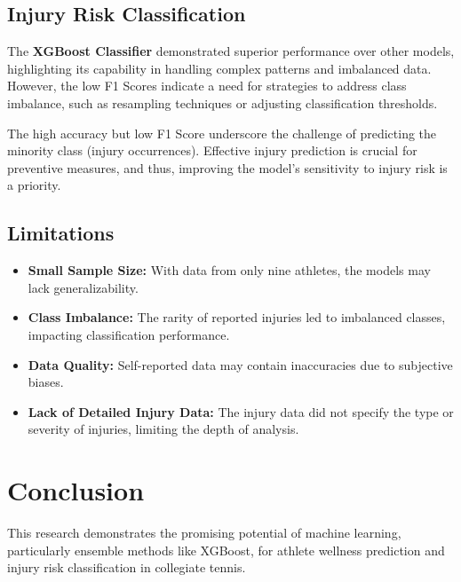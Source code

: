 \documentclass[manuscript,acmsmall,review,screen,authorversion=true]{acmart}
\begin{document}
\subsection{Injury Risk Classification}

The \textbf{XGBoost Classifier} demonstrated superior performance over other models, highlighting its capability in handling complex patterns and imbalanced data. However, the low F1 Scores indicate a need for strategies to address class imbalance, such as resampling techniques or adjusting classification thresholds.

The high accuracy but low F1 Score underscore the challenge of predicting the minority class (injury occurrences). Effective injury prediction is crucial for preventive measures, and thus, improving the model's sensitivity to injury risk is a priority.

\subsection{Limitations}

\begin{itemize}
    \item \textbf{Small Sample Size:} With data from only nine athletes, the models may lack generalizability.

    \item \textbf{Class Imbalance:} The rarity of reported injuries led to imbalanced classes, impacting classification performance.

    \item \textbf{Data Quality:} Self-reported data may contain inaccuracies due to subjective biases.

    \item \textbf{Lack of Detailed Injury Data:} The injury data did not specify the type or severity of injuries, limiting the depth of analysis.
\end{itemize}

\section{Conclusion}

This research demonstrates the promising potential of machine learning, particularly ensemble methods like XGBoost, for athlete wellness prediction and injury risk classification in collegiate tennis.
\end{document}
